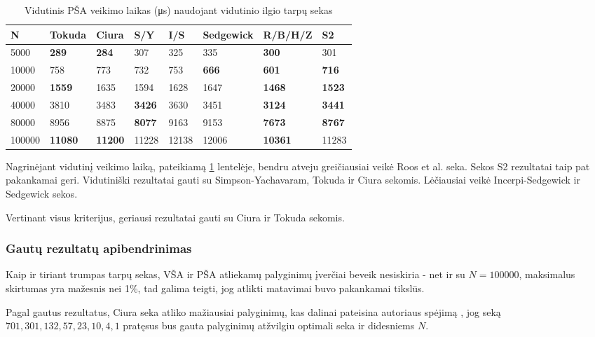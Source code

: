 \documentclass{VUMIFInfKursinis}
\begin{document}
\begin{table}[H]
  \caption{Vidutinis PŠA veikimo laikas (μs) naudojant vidutinio ilgio tarpų sekas}
  \label{iss_medium_runtimes}
  \begin{tabular}{|l|l|l|l|l|l|l|l|}
  \hline
  N      & Tokuda         & Ciura          & S/Y           & I/S   & Sedgewick    & R/B/H/Z        & S2            \\ \hline
  5000   & \textbf{289}   & \textbf{284}   & 307           & 325   & 335          & \textbf{300}   & 301           \\ \hline
  10000  & 758            & 773            & 732           & 753   & \textbf{666} & \textbf{601}   & \textbf{716}  \\ \hline
  20000  & \textbf{1559}  & 1635           & 1594          & 1628  & 1647         & \textbf{1468}  & \textbf{1523} \\ \hline
  40000  & 3810           & 3483           & \textbf{3426} & 3630  & 3451         & \textbf{3124}  & \textbf{3441} \\ \hline
  80000  & 8956           & 8875           & \textbf{8077} & 9163  & 9153         & \textbf{7673}  & \textbf{8767} \\ \hline
  100000 & \textbf{11080} & \textbf{11200} & 11228         & 12138 & 12006        & \textbf{10361} & 11283         \\ \hline
  \end{tabular}
\end{table}

Nagrinėjant vidutinį veikimo laiką, pateikiamą \ref{iss_medium_runtimes} lentelėje, bendru atveju greičiausiai veikė Roos et al. seka.
Sekos S2 rezultatai taip pat pakankamai geri.
Vidutiniški rezultatai gauti su Simpson-Yachavaram, Tokuda ir Ciura sekomis.
Lėčiausiai veikė Incerpi-Sedgewick ir Sedgewick sekos.

Vertinant visus kriterijus, geriausi rezultatai gauti su Ciura ir Tokuda sekomis.

\subsubsection{Gautų rezultatų apibendrinimas}

Kaip ir tiriant trumpas tarpų sekas, VŠA ir PŠA atliekamų palyginimų įverčiai beveik nesiskiria - 
net ir su $N = 100000$, maksimalus skirtumas yra mažesnis nei 1\%, tad galima teigti, jog atlikti matavimai buvo pakankamai tikslūs.

Pagal gautus rezultatus, Ciura seka atliko mažiausiai palyginimų, kas dalinai pateisina autoriaus spėjimą \cite{ciura2001best},
jog seką $701,301,132,57,23,10,4,1$ pratęsus bus gauta palyginimų atžvilgiu optimali seka ir didesniems $N$.
\end{document}
